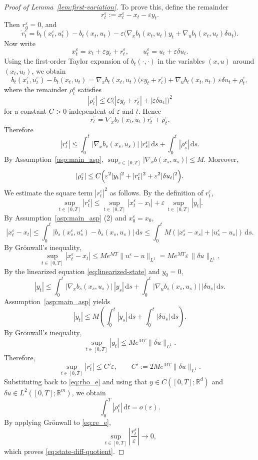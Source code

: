 \documentclass[11pt]{amsart}
\theoremstyle{plain}
\theoremstyle{definition}
\theoremstyle{remark}
\newcommand{\dd}{\,\mathrm{d}}
\begin{document}
\begin{proof}[Proof of Lemma~\ref{lem:first-variation}]
To prove this, define the remainder
\[
r_t^\varepsilon
:=
x_t^\varepsilon-x_t-\varepsilon y_t.
\]
Then $r_0^\varepsilon=0$, and
\[
\dot r_t^\varepsilon
=
b_t(x_t^\varepsilon,u_t^\varepsilon)-b_t(x_t,u_t)
-
\varepsilon\Big(
\nabla_x b_t(x_t,u_t)y_t+\nabla_u b_t(x_t,u_t)\delta u_t
\Big).
\]
Now write
\[
x_t^\varepsilon=x_t+\varepsilon y_t+r_t^\varepsilon,
\qquad
u_t^\varepsilon=u_t+\varepsilon\delta u_t.
\]
Using the first-order Taylor expansion of $b_t(\cdot,\cdot)$ in the variables $(x,u)$
around $(x_t,u_t)$, we obtain
\[
b_t(x_t^\varepsilon,u_t^\varepsilon)-b_t(x_t,u_t)
=
\nabla_x b_t(x_t,u_t)\bigl(\varepsilon y_t+r_t^\varepsilon\bigr)
+
\nabla_u b_t(x_t,u_t)\,\varepsilon\delta u_t
+
\rho_t^\varepsilon,
\]
where the remainder $\rho_t^\varepsilon$ satisfies
\[
|\rho_t^\varepsilon|
\le
C\Big(|\varepsilon y_t+r_t^\varepsilon|+|\varepsilon\delta u_t|\Big)^2
\]
for a constant $C>0$ independent of $\varepsilon$ and $t$.
Hence
\[
\dot r_t^\varepsilon
=
\nabla_x b_t(x_t,u_t) r_t^\varepsilon + \rho_t^\varepsilon.
\]
Therefore
\begin{equation}\label{eq:re_e}
    |r_t^\varepsilon|
\le
\int_0^t |\nabla_x b_s(x_s,u_s)|\,|r_s^\varepsilon|\dd s
+
\int_0^t |\rho_s^\varepsilon|\dd s.
\end{equation}
By Assumption~\ref{asp:main_asp}, $\sup_{s \in [0,T]} |\nabla_x b(x_s, u_s)|\leq M$.
Moreover,
\begin{equation}\label{eq:rho_e}
    |\rho_t^\varepsilon|
\le
C\Bigl(\varepsilon^2|y_t|^2+|r_t^\varepsilon|^2+\varepsilon^2|\delta u_t|^2\Bigr).
\end{equation}
We estimate the square term $|r_t^{\varepsilon}|^2$ as follows. By the definition of $r_t^{\varepsilon}$,
\[
\sup_{t\in[0,T]} |r_t^\varepsilon|
\le
\sup_{t\in[0,T]} |x_t^\varepsilon-x_t|
+
\varepsilon\,\sup_{t\in[0,T]} |y_t|.
\]
By Assumption~\ref{asp:main_asp} (2) and $x_0^{\varepsilon} = x_0$,
\[
|x_t^\varepsilon - x_t| \leq \int_0^t |b_s(x_s^\varepsilon, u_s^\varepsilon) - b_s(x_s, u_s)| \dd s \leq \int_0^t M \left( |x_s^\varepsilon - x_s| + |u_s^\varepsilon - u_s| \right) \dd s.
\]
By Gr\"onwall's inequality,
\[
\sup_{t\in[0,T]} |x_t^\varepsilon-x_t|
\le
M e^{MT} \|u^\varepsilon-u\|_{L^1}
=
M e^{MT} \varepsilon\,\|\delta u\|_{L^1},
\]
By the linearized equation \eqref{eq:linearized-state} and $y_0 = 0$,
\[
|y_t| \leq \int_0^t |\nabla_x b_s(x_s, u_s)|\,|y_s|\dd s + \int_0^t |\nabla_u b_s(x_s, u_s)| \, |\delta u_s| \dd s.
\]
Assumption~\ref{asp:main_asp} yields
\[
|y_t| \leq M \left( \int_0^t |y_s| \dd s + \int_0^t |\delta u_s| \dd s \right).
\]
By Gr\"onwall's inequality,
\[
\sup_{t \in [0,T]} |y_t| \leq M e^{MT}\|\delta u\|_{L^1}.
\]
Therefore,
\[
\sup_{t\in[0,T]} |r_t^\varepsilon|
\le
C' \varepsilon, \qquad C':= 2 Me^{MT} \|\delta u\|_{L^1}.
\]
Substituting back to \eqref{eq:rho_e} and
using that $y\in C([0,T];\mathbb R^d)$ and $\delta u\in L^2([0,T];\mathbb R^m)$, we obtain
\[
\int_0^T |\rho_t^\varepsilon| \dd t = o(\varepsilon).
\]
By applying Gr\"onwall to \eqref{eq:re_e},
\[
\sup_{t\in[0,T]} \left|\frac{r_t^\varepsilon}{\varepsilon}\right|\to 0,
\]
which proves \eqref{eq:state-diff-quotient}.


\end{proof}
\end{document}
